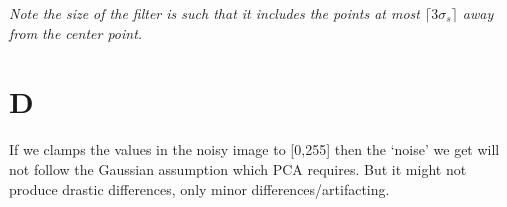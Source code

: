 \documentclass[a4paper, landscape]{article}
\begin{document}
{\it Note the size of the filter is such that it includes the points at most ${\lceil3\sigma_s\rceil}$ away from the center point.
}
\section{D}
If we clamps the values in the noisy image to [0,255] then the `noise' we get will not follow the Gaussian assumption which PCA requires. But it might not produce drastic differences, only minor differences/artifacting. 
\end{document}
